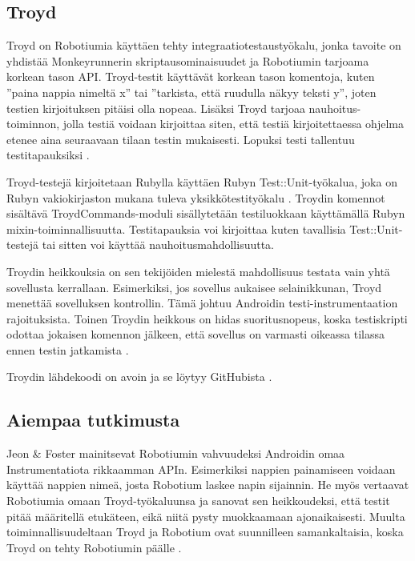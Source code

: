 \subsection{Troyd}

Troyd on Robotiumia käyttäen tehty integraatiotestaustyökalu, jonka tavoite on yhdistää Monkeyrunnerin skriptausominaisuudet ja Robotiumin tarjoama korkean tason API. Troyd-testit käyttävät korkean tason komentoja, kuten ''paina nappia nimeltä x''  tai ''tarkista, että ruudulla näkyy teksti y'', joten testien kirjoituksen pitäisi olla nopeaa. Lisäksi Troyd tarjoaa nauhoitus-toiminnon, jolla testiä voidaan kirjoittaa siten, että testiä kirjoitettaessa ohjelma etenee aina seuraavaan tilaan testin mukaisesti. Lopuksi testi tallentuu testitapauksiksi \cite{troyd}.

Troyd-testejä kirjoitetaan Rubylla käyttäen Rubyn Test::Unit-työkalua, joka on Rubyn vakiokirjaston mukana tuleva yksikkötestityökalu \cite{testunit}. Troydin komennot sisältävä TroydCommands-moduli sisällytetään testiluokkaan käyttämällä Rubyn mixin-toiminnallisuutta. Testitapauksia voi kirjoittaa kuten tavallisia Test::Unit-testejä tai sitten voi käyttää nauhoitusmahdollisuutta.

Troydin heikkouksia on sen tekijöiden mielestä mahdollisuus testata vain yhtä sovellusta kerrallaan. Esimerkiksi, jos sovellus aukaisee selainikkunan, Troyd menettää sovelluksen kontrollin. Tämä johtuu Androidin testi-instrumentaation rajoituksista. Toinen Troydin heikkous on hidas suoritusnopeus, koska testiskripti odottaa jokaisen komennon jälkeen, että sovellus on varmasti oikeassa tilassa ennen testin jatkamista \cite{troyd}.

Troydin lähdekoodi on avoin ja se löytyy GitHubista \cite{troyd_github}.

\subsection{Aiempaa tutkimusta}

Jeon \& Foster mainitsevat Robotiumin vahvuudeksi Androidin omaa Instrumentatiota rikkaamman APIn. Esimerkiksi nappien painamiseen voidaan käyttää nappien nimeä, josta Robotium laskee napin sijainnin. He myös vertaavat Robotiumia omaan Troyd-työkaluunsa ja sanovat sen heikkoudeksi, että testit pitää määritellä etukäteen, eikä niitä pysty muokkaamaan ajonaikaisesti. Muulta toiminnallisuudeltaan Troyd ja Robotium ovat suunnilleen samankaltaisia, koska Troyd on tehty Robotiumin päälle \cite{troyd}.

